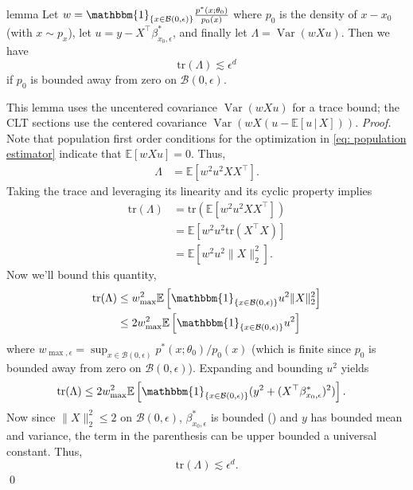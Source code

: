 \documentclass[11pt]{article}
\begin{document}
\begin{restatable}{lemma}{} \label{lemma: Lambda trace bound}
    Let $w = \mathbbm{1}_{\{x \in \mathcal{B}(0, \epsilon)\}}\frac{p^*(x; \theta_0)}{p_0(x)}$ where $p_0$ is the density of $x - x_0$ (with $x \sim p_x$), let $u = y - X^{\top}\beta_{x_0, \epsilon}^*$, and finally let $\Lambda = \operatorname{Var}(wXu)$. Then we have
    \[\text{tr}\left(\Lambda\right) \lesssim \epsilon^{d} \]
    if $p_0$ is bounded away from zero on $\mathcal{B}(0, \epsilon)$.
\end{restatable}
This lemma uses the uncentered covariance $\operatorname{Var}(wXu)$ for a trace bound; the CLT sections use the centered covariance $\operatorname{Var}(wX(u - \mathbb{E}[u\,|\,X]))$.
\noindent \textit{Proof.} Note that population first order conditions for the optimization in \cref{eq: population estimator} indicate that $\mathbb{E}[wXu] = 0$. Thus,
\begin{align*}
    \Lambda &= \mathbb{E}\left[w^2u^2XX^{\top}\right].
\end{align*}
Taking the trace and leveraging its linearity and its cyclic property implies
\begin{align*}
    \text{tr}(\Lambda) &= \text{tr}\left(\mathbb{E}\left[w^2u^2XX^{\top}\right]\right) \\
    &= \mathbb{E}\left[w^2u^2\text{tr}\left(X^{\top}X\right)\right] \\
    &= \mathbb{E}\left[w^2u^2\|X\|_2^2\right]. 
\end{align*}
Now we'll bound this quantity,
\begin{align*}
    \text{tr}(\Lambda) &\leq  w_{\max}^2\mathbb{E}\left[\mathbbm{1}_{\{x \in \mathcal{B}(0, \epsilon)\}}u^2\|X\|_2^2\right] \\
    &\leq 2w_{\max}^2\mathbb{E}\left[\mathbbm{1}_{\{x \in \mathcal{B}(0, \epsilon)\}}u^2\right]
\end{align*}
where $w_{\max, \epsilon} = \sup_{x \in \mathcal{B}(0, \epsilon)}p^*(x; \theta_0)/p_0(x)$ (which is finite since $p_0$ is bounded away from zero on $\mathcal{B}(0, \epsilon)$). Expanding and bounding $u^2$ yields
\begin{align*}
    \text{tr}(\Lambda) &\leq 2w_{\max}^2\mathbb{E}\left[\mathbbm{1}_{\{x \in \mathcal{B}(0, \epsilon)\}}(y^2 + (X^{\top}\beta^*_{x_0, \epsilon})^2)\right]. 
\end{align*}
Now since $\|X\|_2^2 \leq 2$ on $\mathcal{B}(0, \epsilon)$, $\beta^*_{x_0, \epsilon}$ is bounded () and $y$ has bounded mean and variance, the term in the parenthesis can be upper bounded a universal constant. Thus,
\[\text{tr}(\Lambda) \lesssim \epsilon^d.\]
\qed{}
\end{document}

